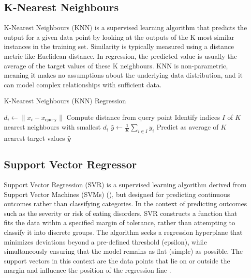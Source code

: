 \subsection{K-Nearest Neighbours}

K-Nearest Neighbours (KNN) is a supervised learning algorithm that predicts the output for a given data point by looking at the outputs of the K most similar instances in the training set. Similarity is typically measured using a distance metric like Euclidean distance. In regression, the predicted value is usually the average of the target values of these K neighbours. KNN is non-parametric, meaning it makes no assumptions about the underlying data distribution, and it can model complex relationships with sufficient data.

\begin{algorithm}
    \caption{K-Nearest Neighbours (KNN) Regression}
    \label{algo:knn}
    \begin{algorithmic}[1]
        \Statex
            \State $d_i \gets \|x_i - x_{\text{query}}\|$
            \Comment Compute distance from query point
        \EndFor
        \State Identify indices $I$ of $K$ nearest neighbours with smallest $d_i$
        \State $\hat{y} \gets \frac{1}{K} \sum_{i \in I} y_i$
        \Comment Predict as average of $K$ nearest target values
        \State \Return $\hat{y}$
        \EndFunction
    \end{algorithmic}
\end{algorithm}

\subsection{Support Vector Regressor}

Support Vector Regression (SVR) is a supervised learning algorithm derived from Support Vector Machines (SVMs) (\cite{svr}), but designed for predicting continuous outcomes rather than classifying categories. In the context of predicting outcomes such as the severity or risk of eating disorders, SVR constructs a function that fits the data within a specified margin of tolerance, rather than attempting to classify it into discrete groups. The algorithm seeks a regression hyperplane that minimizes deviations beyond a pre-defined threshold (epsilon), while simultaneously ensuring that the model remains as flat (simple) as possible. The support vectors in this context are the data points that lie on or outside the margin and influence the position of the regression line \cite{kuhn2016}.

